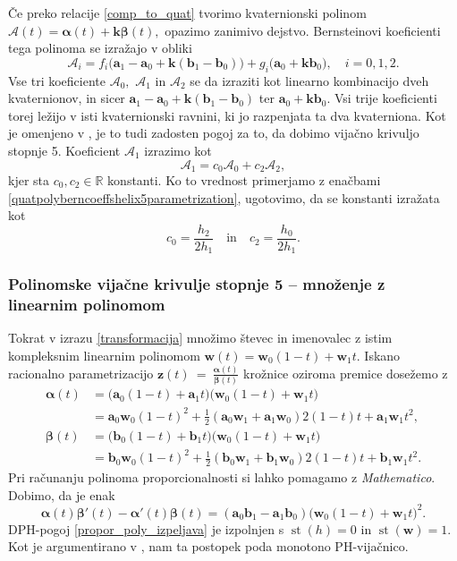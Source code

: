 \documentclass[12pt,a4paper,twoside]{article}
\theoremstyle{definition} %
\theoremstyle{plain} %
\theoremstyle{primerstyle}
\numberwithin{equation}{section}  %
\newcommand{\R}{\mathbb R}
\newcommand{\aV}{\mathbf{a}}
\newcommand{\bV}{\mathbf{b}}
\newcommand{\kV}{\mathbf{k}}
\newcommand{\wV}{\mathbf{w}}
\newcommand{\zV}{\mathbf{z}}
\newcommand{\AQ}{\mathcal{A}}
\newcommand{\balpha}{\boldsymbol \alpha}
\newcommand{\bbeta}{\boldsymbol \beta}
\DeclareMathOperator{\st}{st}
\begin{document}
Če preko relacije \eqref{comp_to_quat} tvorimo kvaternionski polinom $\AQ(t)=\balpha(t)+\kV\bbeta(t),$ opazimo zanimivo dejstvo. Bernsteinovi koeficienti tega polinoma se izražajo v obliki
\begin{equation}
	\label{quatpolyberncoeffshelix5parametrization}
	\AQ_i=f_i\big(\aV_1-\aV_0+\kV(\bV_1-\bV_0)\big)+g_i\big(\aV_0+\kV\bV_0\big),\quad i=0,1,2.
\end{equation}
Vse tri koeficiente $\AQ_0,$ $\AQ_1$ in $\AQ_2$ se da izraziti kot linearno kombinacijo dveh kvaternionov, in sicer $\aV_1-\aV_0+\kV(\bV_1-\bV_0)$ ter $\aV_0+\kV\bV_0.$ Vsi trije koeficienti torej ležijo v isti kvaternionski ravnini, ki jo razpenjata ta dva kvaterniona. Kot je omenjeno v \cite[str.\ 378]{faroukietal2004}, je to tudi zadosten pogoj za to, da dobimo vijačno krivuljo stopnje 5. Koeficient $\AQ_1$ izrazimo kot 
\begin{equation}
	\label{A1kotA0inA2}
	\AQ_1=c_0\AQ_0+c_2\AQ_2,
\end{equation}	
kjer sta $c_0,c_2\in\R$ konstanti. Ko to vrednost primerjamo z enačbami \eqref{quatpolyberncoeffshelix5parametrization}, ugotovimo, da se konstanti izražata kot
\begin{equation*}
	c_0=\frac{h_2}{2h_1}\quad\text{in}\quad c_2=\frac{h_0}{2h_1}.
\end{equation*}

\subsubsection{Polinomske vijačne krivulje stopnje 5 -- množenje z linearnim polinomom}
\label{mnozenje_linearni_polinom_5}

Tokrat v izrazu \eqref{transformacija} množimo števec in imenovalec z istim kompleksnim linearnim polinomom $\wV(t)=\wV_0(1-t)+\wV_1t.$ Iskano racionalno parametrizacijo $\zV(t)~=~\frac{\balpha(t)}{\bbeta(t)}$ krožnice oziroma premice dosežemo z
\begin{align}
	\balpha(t)&=\big(\aV_0(1-t)+\aV_1t\big)\big(\wV_0(1-t)+\wV_1t\big)\nonumber\\
	&=\aV_0\wV_0(1-t)^2+\frac{1}{2}(\aV_0\wV_1+\aV_1\wV_0)2(1-t)t+\aV_1\wV_1t^2,\label{kompl_polinoma_mnozenje_lin_pol}\\
	\bbeta(t)&=\big(\bV_0(1-t)+\bV_1t\big)\big(\wV_0(1-t)+\wV_1t\big)\nonumber\\
	&=\bV_0\wV_0(1-t)^2+\frac{1}{2}(\bV_0\wV_1+\bV_1\wV_0)2(1-t)t+\bV_1\wV_1t^2.\nonumber
\end{align}
Pri računanju polinoma proporcionalnosti si lahko pomagamo z \emph{Mathematico}. Dobimo, da je enak
\begin{equation*}
	\balpha(t)\bbeta'(t)-\balpha'(t)\bbeta(t)=(\aV_0\bV_1-\aV_1\bV_0)\big(\wV_0(1-t)+\wV_1t\big)^2.
\end{equation*}
DPH-pogoj \eqref{propor_poly_izpeljava} je izpolnjen s $\st(h)=0$ in $\st(\wV)=1.$ Kot je argumentirano v \cite[str.\ 118]{beltranmonterde}, nam ta postopek poda monotono PH-vijačnico.
\end{document}
